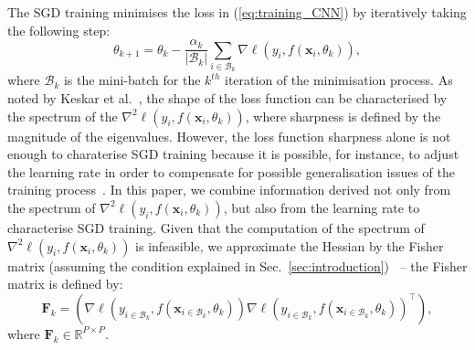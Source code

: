 \documentclass[10pt,journal,compsoc]{IEEEtran}
\begin{document}
The SGD training minimises the loss in (\ref{eq:training_CNN}) by iteratively taking the following step:
\begin{equation}
\theta_{k+1} = \theta_{k} -   \frac{\alpha_k}{|\mathcal{B}_k|} \sum_{i \in \mathcal{B}_k} \nabla \ell(y_i,f(\mathbf{x}_i,\theta_k)),
\label{eq:sgd}
\end{equation}
where $\mathcal{B}_k$ is the mini-batch for the $k^{th}$ iteration of the minimisation process.
As noted by Keskar et al.~\cite{keskar2016large}, the shape of the loss function can be characterised by the spectrum of the $\nabla^2 \ell(y_i,f(\mathbf{x}_i,\theta_k))$, where sharpness is defined by the magnitude of the eigenvalues. %
However, the loss function sharpness alone is not enough to charaterise SGD training because it is possible, for instance, to adjust the learning rate in order to compensate for possible generalisation issues of the training process~\cite{goyal2017accurate, jastrzkebski2017three, smith2017don}.
In this paper, we combine information derived not only from the spectrum of $\nabla^2 \ell(y_i,f(\mathbf{x}_i,\theta_k))$, but also from the learning rate to characterise SGD training. %
Given that the computation of the spectrum of $\nabla^2 \ell(y_i,f(\mathbf{x}_i,\theta_k))$ is infeasible, we approximate the Hessian by the Fisher matrix (assuming the condition explained in Sec.~\ref{sec:introduction})~\cite{jastrzkebski2017three,chaudhari2016entropy,martens2014new} -- the Fisher matrix is defined by:
\begin{equation}
\mathbf{F}_k = \left ( \nabla \ell(y_{i \in \mathcal{B}_k},f(\mathbf{x}_{i \in \mathcal{B}_k},\theta_k))  \nabla \ell(y_{i \in \mathcal{B}_k},f(\mathbf{x}_{i \in \mathcal{B}_k},\theta_k))^{\top} \right ),
\label{eq:F_k}
\end{equation}
where $\mathbf{F}_k \in \mathbb R^{P \times P}$. 
\end{document}
